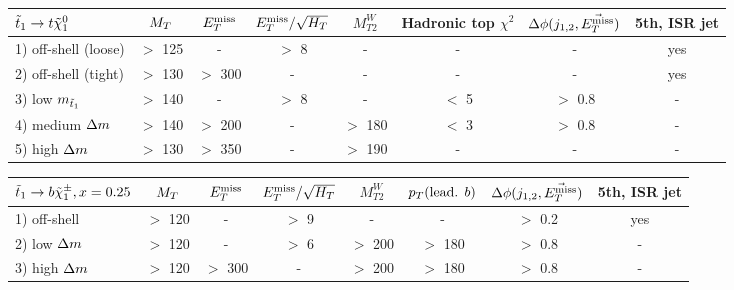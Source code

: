 \begin{table}[!ht]
{\footnotesize
\begin{center}
\hspace*{-0.8cm}
    \begin{tabular}{|l|ccccccc|}
    \hline
    $\tilde{t}_1 \rightarrow t\tilde{\chi}_1^0$ & $M_T$   & $E_T^\text{miss}$    & $E_T^\text{miss}/\sqrt{H_T}$  & $M_{T2}^W$ & Hadronic top $\chi^2$ & $\Delta\phi(j_{1,2},\vec{E_T^\text{miss}})$      &   5th, ISR jet \\
    \hline                                                                                                                                     
    1) off-shell (loose)       & $>$ 125 & -       &   $>$ 8            &     -     & -             &          - &    yes        \\
    2) off-shell (tight)       & $>$ 130 & $>$ 300 &   -                &     -     & -        	    &          - &    yes        \\
    3) low    $m_{\tilde{t}_1}$  & $>$ 140 & -       &   $>$ 8            &     -     &  $<$ 5        &  $>$ 0.8   &    -          \\
    4) medium $\Delta m$        & $>$ 140 & $>$ 200 &   -                &  $>$ 180  &  $<$ 3        &  $>$ 0.8   &    -          \\
    5) high   $\Delta m$        & $>$ 130 & $>$ 350 &   -                &  $>$ 190  & -             &          - &    -          \\
        \hline
    \end{tabular}
    \hspace*{-0.5cm}
    \begin{tabular}{|l|ccccccc|}
    \hline
    $\tilde{t}_1 \rightarrow b\tilde{\chi}_1^\pm, x=0.25$   & $M_T$     & $E_T^\text{miss}$    & $E_T^\text{miss}/\sqrt{H_T}$ & $M_{T2}^W$ & $p_T(\text{lead. }b)$ & $\Delta\phi(j_{1,2},\vec{E_T^\text{miss}})$ & 5th, ISR jet  \\
    \hline                                                                                                                      
    1) off-shell        & $>$ 120   &  -       &    $>$  9       &     -      &   -                   &  $>$ 0.2      & yes           \\
    2) low    $\Delta m$ & $>$ 120   &  -       &    $>$  6       &  $>$ 200   & $>$ 180               &  $>$ 0.8      & -             \\
    3) high   $\Delta m$ & $>$ 120   & $>$ 300  &     -           &  $>$ 200   & $>$ 180               &  $>$ 0.8      & -             \\
    \hline

\end{tabular}
\end{center}}
\end{table}

